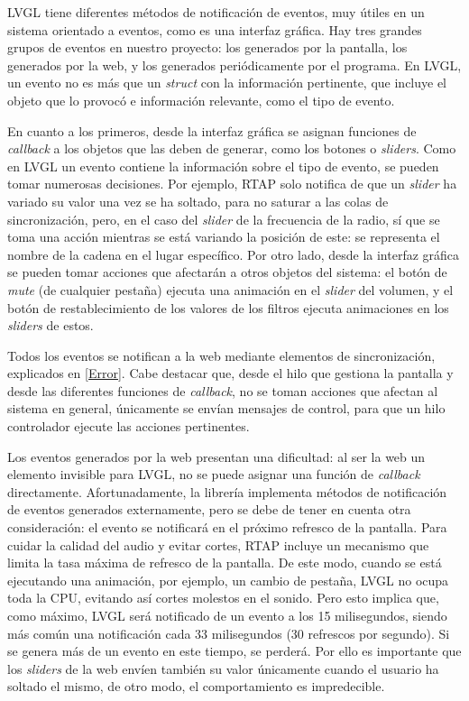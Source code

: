 LVGL tiene diferentes métodos de notificación de eventos, muy útiles en un sistema orientado a eventos, como es una interfaz gráfica. Hay tres grandes grupos de eventos en nuestro proyecto: los generados por la pantalla, los generados por la web, y los generados periódicamente por el programa. En LVGL, un evento no es más que un \textit{struct} con la información pertinente, que incluye el objeto que lo provocó e información relevante, como el tipo de evento.

En cuanto a los primeros, desde la interfaz gráfica se asignan funciones de \textit{callback} a los objetos que las deben de generar, como los botones o \textit{sliders}. Como en LVGL un evento contiene la información sobre el tipo de evento, se pueden tomar numerosas decisiones. Por ejemplo, RTAP solo notifica de que un \textit{slider} ha variado su valor una vez se ha soltado, para no saturar a las colas de sincronización, pero, en el caso del \textit{slider} de la frecuencia de la radio, sí que se toma una acción mientras se está variando la posición de este: se representa el nombre de la cadena en el lugar específico. Por otro lado, desde la interfaz gráfica se pueden tomar acciones que afectarán a otros objetos del sistema: el botón de \textit{mute} (de cualquier pestaña) ejecuta una animación en el \textit{slider} del volumen, y el botón de restablecimiento de los valores de los filtros ejecuta animaciones en los \textit{sliders} de estos.

Todos los eventos se notifican a la web mediante elementos de sincronización, explicados en \ref{Error}. Cabe destacar que, desde el hilo que gestiona la pantalla y desde las diferentes funciones de \textit{callback}, no se toman acciones que afectan al sistema en general, únicamente se envían mensajes de control, para que un hilo controlador ejecute las acciones pertinentes.

Los eventos generados por la web presentan una dificultad: al ser la web un elemento invisible para LVGL, no se puede asignar una función de \textit{callback} directamente. Afortunadamente, la librería implementa métodos de notificación de eventos generados externamente, pero se debe de tener en cuenta otra consideración: el evento se notificará en el próximo refresco de la pantalla. Para cuidar la calidad del audio y evitar cortes, RTAP incluye un mecanismo que limita la tasa máxima de refresco de la pantalla. De este modo, cuando se está ejecutando una animación, por ejemplo, un cambio de pestaña, LVGL no ocupa toda la CPU, evitando así cortes molestos en el sonido. Pero esto implica que, como máximo, LVGL será notificado de un evento a los 15 milisegundos, siendo más común una notificación cada 33 milisegundos (30 refrescos por segundo). Si se genera más de un evento en este tiempo, se perderá. Por ello es importante que los \textit{sliders} de la web envíen también su valor únicamente cuando el usuario ha soltado el mismo, de otro modo, el comportamiento es impredecible. 

